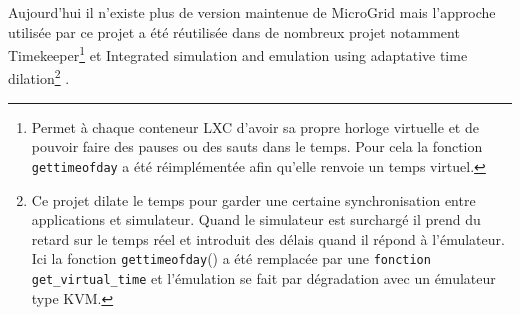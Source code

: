 Aujourd'hui il n'existe plus de version maintenue de MicroGrid mais l'approche utilisée par ce projet a été réutilisée dans de nombreux projet notamment Timekeeper\footnote{Permet à chaque conteneur LXC d'avoir sa propre horloge virtuelle et de pouvoir faire des pauses ou des sauts dans le temps. Pour cela la fonction \texttt{gettimeofday} a été réimplémentée afin qu'elle renvoie un temps virtuel.} \citep{MICROGRID_lamps2014timekeeper} et Integrated simulation and emulation using adaptative time dilation\footnote{Ce projet  dilate le temps pour garder une certaine synchronisation entre applications et simulateur. Quand le simulateur est surchargé il prend du retard sur le temps réel et introduit des délais quand il répond à l'émulateur. Ici la fonction \texttt{gettimeofday}() a été remplacée par une \texttt{fonction get\_virtual\_time} et l'émulation se fait par dégradation avec un émulateur type KVM.} \citep{MICROGRID_lee2014integrated}.
